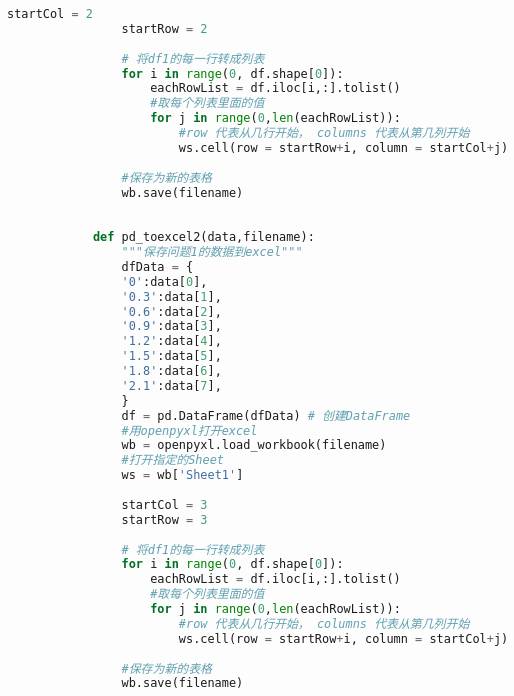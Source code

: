 \documentclass[withoutpreface,bwprint]{cumcmthesis} %
\begin{document}
\begin{appendices}
\begin{lstlisting}[language=python]
                startCol = 2
                startRow = 2
                
                # 将df1的每一行转成列表
                for i in range(0, df.shape[0]):
                    eachRowList = df.iloc[i,:].tolist()
                    #取每个列表里面的值
                    for j in range(0,len(eachRowList)):
                        #row 代表从几行开始， columns 代表从第几列开始
                        ws.cell(row = startRow+i, column = startCol+j).value =eachRowList[j]
                
                #保存为新的表格
                wb.save(filename)
            
            
            def pd_toexcel2(data,filename):
                """保存问题1的数据到excel"""
                dfData = { 
                '0':data[0],
                '0.3':data[1],
                '0.6':data[2],
                '0.9':data[3],
                '1.2':data[4],
                '1.5':data[5],
                '1.8':data[6],
                '2.1':data[7],
                }
                df = pd.DataFrame(dfData) # 创建DataFrame
                #用openpyxl打开excel
                wb = openpyxl.load_workbook(filename)
                #打开指定的Sheet
                ws = wb['Sheet1']
                
                startCol = 3
                startRow = 3
                
                # 将df1的每一行转成列表
                for i in range(0, df.shape[0]):
                    eachRowList = df.iloc[i,:].tolist()
                    #取每个列表里面的值
                    for j in range(0,len(eachRowList)):
                        #row 代表从几行开始， columns 代表从第几列开始
                        ws.cell(row = startRow+i, column = startCol+j).value =eachRowList[j]
                
                #保存为新的表格
                wb.save(filename)
            \end{lstlisting}
            

        \end{appendices}
    
\end{document}
